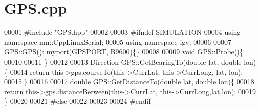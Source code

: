 \hypertarget{GPS_8cpp_source}{}\section{G\+P\+S.\+cpp}
\label{GPS_8cpp_source}

\begin{DoxyCode}
00001 \textcolor{preprocessor}{#}\textcolor{preprocessor}{include} \textcolor{preprocessor}{"GPS.hpp"}
00002 
00003 \textcolor{preprocessor}{#}\textcolor{preprocessor}{ifndef} \textcolor{preprocessor}{SIMULATION}
00004 \textcolor{keyword}{using} \textcolor{keyword}{namespace} mn::CppLinuxSerial;
00005 \textcolor{keyword}{using} \textcolor{keyword}{namespace} igv;
00006 
00007 GPS::GPS(): myport(GPSPORT, B9600)\{\}
00008 
00009 \textcolor{keywordtype}{void} GPS::Probe()\{
00010 
00011 \}
00012 
00013 Direction GPS::GetBearingTo(\textcolor{keywordtype}{double} lat, \textcolor{keywordtype}{double} lon)\{
00014     \textcolor{keywordflow}{return} \textcolor{keyword}{this}->gps.courseTo(\textcolor{keyword}{this}->CurrLat, \textcolor{keyword}{this}->CurrLong, lat, lon);
00015 \}
00016 
00017 \textcolor{keywordtype}{double} GPS::GetDistanceTo(\textcolor{keywordtype}{double} lat, \textcolor{keywordtype}{double} lon)\{
00018     \textcolor{keywordflow}{return} \textcolor{keyword}{this}->gps.distanceBetween(\textcolor{keyword}{this}->CurrLat, \textcolor{keyword}{this}->CurrLong,lat,lon);
00019 \}
00020 
00021 \textcolor{preprocessor}{#}\textcolor{preprocessor}{else}
00022 
00023 
00024 \textcolor{preprocessor}{#}\textcolor{preprocessor}{endif}
\end{DoxyCode}
